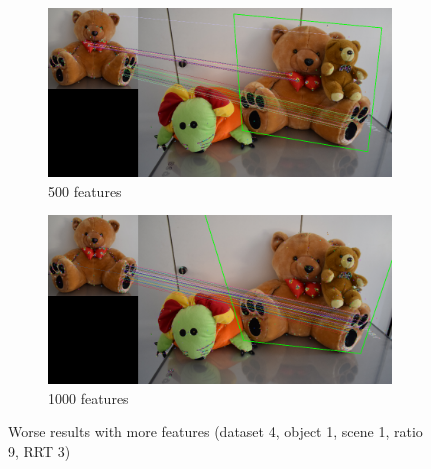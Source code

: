 \documentclass[a4paper]{article}
\begin{document}
\begin{figure}[h!]
    \begin{subfigure}[b]{0.45\textwidth}
        \includegraphics[width=\textwidth]{Data4_DetRANMatches_0_0_ratio9_RRT3_NF500.png}
        \caption{500 features}
        \label{fig:data400935}
    \end{subfigure}
    \quad
    \begin{subfigure}[b]{0.45\textwidth}
        \includegraphics[width=\textwidth]{Data4_DetRANMatches_0_0_ratio9_RRT3_NF1000.png}
        \caption{1000 features}
        \label{fig:data400931}
    \end{subfigure}
    \caption{Worse results with more features (dataset 4, object 1, scene 1, ratio 9, RRT 3)}
    \label{fig:data4worse}
\end{figure}
\end{document}
